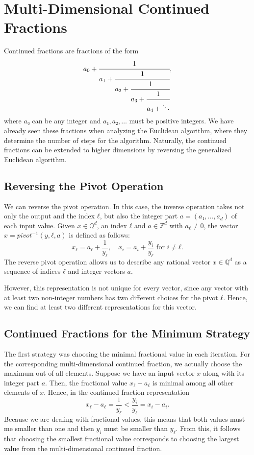 \chapter{Multi-Dimensional Continued Fractions}

Continued fractions are fractions of the form
\[
  a_0 + \cfrac{1}{a_1 + \cfrac{1}{a_2 + \cfrac{1}{a_3 + \cfrac{1}{a_4 + \ddots}}}},
\]
where $a₀$ can be any integer and $a₁, a₂, \dots$ must be positive integers.
We have already seen these fractions when analyzing the Euclidean algorithm,
where they determine the number of steps for the algorithm.
Naturally, the continued fractions can be extended to higher dimensions by
reversing the generalized Euclidean algorithm.

\section{Reversing the Pivot Operation}

We can reverse the pivot operation.
In this case, the inverse operation takes not only the output and the index $ℓ$,
but also the integer part $a = (a₁, \dots, a_d)$ of each input value.
Given $x ∈ ℚ^d$, an index $ℓ$ and $a ∈ ℤ^d$ with $a_ℓ ≠ 0$,
the vector $x = pivot^{-1}(y, ℓ, a)$ is defined as follows:
\[
  x_ℓ = a_ℓ + \frac{1}{y_ℓ}, \quad x_i = a_i + \frac{y_i}{y_ℓ} \text{ for } i ≠ ℓ.
\]
The reverse pivot operation allows us to describe any rational vector $x ∈ ℚ^d$ as a
sequence of indices $ℓ$ and integer vectors $a$.

However, this representation is not unique for every vector,
since any vector with at least two non-integer numbers has two different
choices for the pivot $ℓ$.
Hence, we can find at least two different representations for this vector.

\section{Continued Fractions for the Minimum Strategy}

The first strategy was choosing the minimal fractional value in each iteration.
For the corresponding multi-dimensional continued fraction,
we actually choose the maximum out of all elements.
Suppose we have an input vector $x$ along with its integer part $a$.
Then, the fractional value $x_ℓ - a_ℓ$ is minimal among all other elements of $x$.
Hence, in the continued fraction representation
\[
  x_ℓ - a_ℓ = \frac{1}{y_ℓ} < \frac{y_i}{y_ℓ} = x_i - a_i.
\]
Because we are dealing with fractional values, this means that both values must
me smaller than one and then $y_i$ must be smaller than $y_ℓ$.
From this, it follows that choosing the smallest fractional value corresponds
to choosing the largest value from the multi-dimensional continued fraction.

